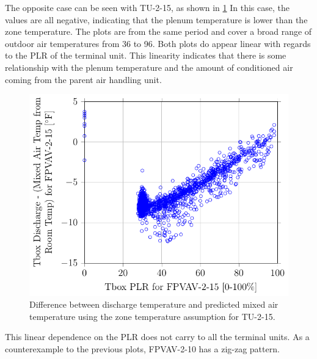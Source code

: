 The opposite case can be seen with TU-2-15, as shown in \figref{}
\ref{fig:2017-01-09-1434-TboxDischargeMixedAirTempfromRoomTempforFPVAV215vsTboxPLRforFPVAV215}
In this case, the values are all negative, indicating that the plenum
temperature is lower than the zone temperature. The plots are from the
same period and cover a broad range of outdoor air temperatures from
\SI{36}{\degreeF} to \SI{96}{\degreeF}. Both plots do appear linear with
regards to the PLR of the terminal unit. This linearity indicates that there is
some relationship with the plenum temperature and the amount of
conditioned air coming from the parent air handling unit.

\begin{figure}
\centering
\includegraphics[]{Plots/2017-01-09-1434-TboxDischargeMixedAirTempfromRoomTempforFPVAV215vsTboxPLRforFPVAV215.pdf}
\caption{Difference between discharge temperature and predicted mixed
air temperature using the zone temperature assumption for TU-2-15.}
\label{fig:2017-01-09-1434-TboxDischargeMixedAirTempfromRoomTempforFPVAV215vsTboxPLRforFPVAV215}
\end{figure}


This linear dependence on the PLR does not carry to all the terminal
units. As a counterexample to the previous plots, FPVAV-2-10 has a
zig-zag pattern. 


